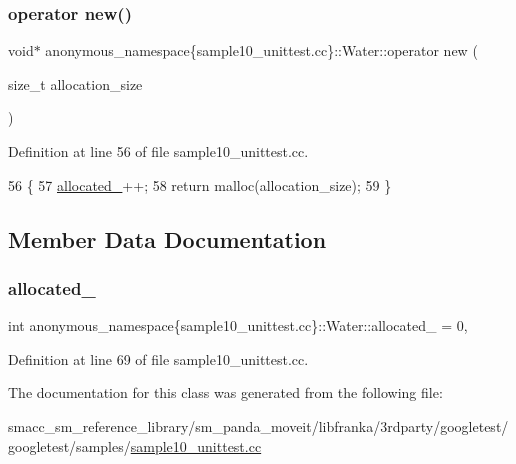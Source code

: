 \subsubsection{\texorpdfstring{operator new()}{operator new()}}
{\footnotesize\ttfamily void$\ast$ anonymous\+\_\+namespace\{sample10\+\_\+unittest.\+cc\}\+::Water\+::operator new (\begin{DoxyParamCaption}\item[{size\+\_\+t}]{allocation\+\_\+size }\end{DoxyParamCaption})\hspace{0.3cm}{\ttfamily [inline]}}



Definition at line 56 of file sample10\+\_\+unittest.\+cc.


\begin{DoxyCode}
56                                              \{
57     \hyperlink{classanonymous__namespace_02sample10__unittest_8cc_03_1_1Water_aca2af792049d025e9993fcae13dc7966}{allocated\_}++;
58     \textcolor{keywordflow}{return} malloc(allocation\_size);
59   \}
\end{DoxyCode}


\subsection{Member Data Documentation}
\mbox{\label{classanonymous__namespace_02sample10__unittest_8cc_03_1_1Water_aca2af792049d025e9993fcae13dc7966}} 
\subsubsection{\texorpdfstring{allocated\+\_\+}{allocated\_}}
{\footnotesize\ttfamily int anonymous\+\_\+namespace\{sample10\+\_\+unittest.\+cc\}\+::Water\+::allocated\+\_\+ = 0\hspace{0.3cm}{\ttfamily [static]}, {\ttfamily [private]}}



Definition at line 69 of file sample10\+\_\+unittest.\+cc.



The documentation for this class was generated from the following file\+:\begin{DoxyCompactItemize}
\item 
smacc\+\_\+sm\+\_\+reference\+\_\+library/sm\+\_\+panda\+\_\+moveit/libfranka/3rdparty/googletest/googletest/samples/\hyperlink{sample10__unittest_8cc}{sample10\+\_\+unittest.\+cc}\end{DoxyCompactItemize}

